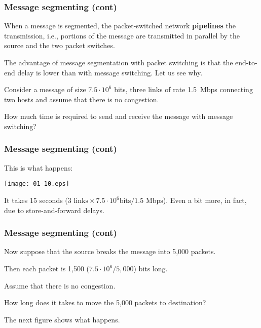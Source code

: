 %
\begin{frame}
\frametitle{Message segmenting (cont)}

When a message is segmented, the packet-switched network
\textbf{pipelines} the transmission, i.e., portions of the message are
transmitted in parallel by the source and the two packet switches.

\bigskip

The advantage of message segmentation with packet switching is that
the end-to-end delay is lower than with message switching. Let us see
why.

\bigskip

Consider a message of size \(7.5 \cdot 10^6\) bits, three links of
rate 1.5~Mbps connecting two hosts and assume that there is no
congestion.

\bigskip

How much time is required to send and receive the message with message
switching?

\end{frame}

%
\begin{frame}
\frametitle{Message segmenting (cont)}

This is what happens:
\begin{center}
\texttt{[image: 01-10.eps]}
\end{center}
It takes 15 seconds (\(3 \text{ links} \times 7.5 \cdot 10^6 \text{
bits}/1.5 \text{ Mbps}\)). Even a bit more, in fact, due to
store-and-forward delays.

\end{frame}

%
\begin{frame}
\frametitle{Message segmenting (cont)}

Now suppose that the source breaks the message into 5,000 packets.

\bigskip

Then each packet is 1,500 (\(7.5 \cdot 10^6/5,000\)) bits long.

\bigskip

Assume that there is no congestion.

\bigskip

How long does it takes to move the 5,000 packets to destination?

\bigskip

The next figure shows what happens.

\end{frame}

